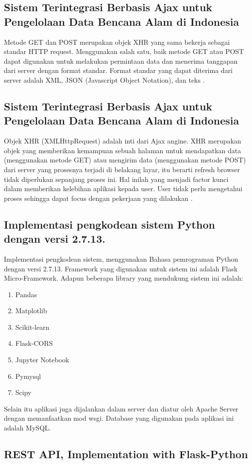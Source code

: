 \subsection{Sistem Terintegrasi Berbasis Ajax untuk Pengelolaan Data Bencana Alam di Indonesia}
Metode GET dan POST merupakan objek XHR yang sama bekerja sebagai standar HTTP request. Menggunakan salah satu, baik metode GET atau POST dapat digunakan untuk melakukan permintaan data dan menerima tanggapan dari server dengan format standar. Format standar yang dapat diterima dari server adalah XML, JSON (Javascript Object Notation), dan teks \cite{prasetyo2007sistem}.
\subsection{Sistem Terintegrasi Berbasis Ajax untuk Pengelolaan Data Bencana Alam di Indonesia}
Objek XHR (XMLHttpRequest) adalah inti dari Ajax angine. XHR merupakan objek yang memberikan kemampuan sebuah halaman untuk mendapatkan data (menggunakan metode GET) atau mengirim data (menggunakan metode POST) dari server yang prosesnya terjadi di belakang layar, itu berarti refresh browser tidak diperlukan sepanjang proses ini. Hal inilah yang menjadi factor kunci dalam memberikan kelebihan aplikasi kepada user. User tidak perlu mengetahui proses sehingga dapat focus dengan pekerjaan yang dilakukan \cite{prasetyo2007sistem}.
\subsection{Implementasi pengkodean sistem Python dengan versi 2.7.13.}
Implementasi pengkodean sistem, menggunakan Bahasa pemrograman Python dengan versi 2.7.13. Framework yang digunakan untuk sistem ini adalah Flask Micro-Framework. Adapun beberapa library yang mendukung sistem ini adalah:
\begin{enumerate}
\item Pandas
\item Matplotlib
\item Scikit-learn
\item Flask-CORS
\item Jupyter Notebook
\item Pymysql
\item Scipy
\end{enumerate}
Selain itu aplikasi juga dijalankan dalam server dan diatur oleh Apache Server dengan memanfaatkan mod wsgi. Database yang digunakan pada aplikasi ini adalah MySQL\cite{gunawan2018aplikasi}.
\subsection{REST API, Implementation with Flask-Python}
